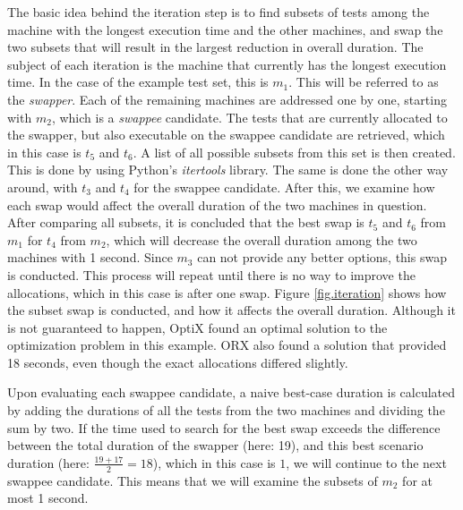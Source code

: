 The basic idea behind the iteration step is to find subsets of tests among the machine with the longest execution time and the other machines, and swap the two subsets that will result in the largest reduction in overall duration. The subject of each iteration is the machine that currently has the longest execution time. In the case of the example test set, this is $m_{1}$. This will be referred to as the \emph{swapper}. Each of the remaining machines are addressed one by one, starting with $m_{2}$, which is a \emph{swappee} candidate. The tests that are currently allocated to the swapper, but also executable on the swappee candidate are retrieved, which in this case is $t_{5}$ and $t_{6}$. A list of all possible subsets from this set is then created. This is done by using Python's \emph{itertools} library. The same is done the other way around, with $t_{3}$ and $t_{4}$ for the swappee candidate. After this, we examine how each swap would affect the overall duration of the two machines in question. After comparing all subsets, it is concluded that the best swap is $t_{5}$ and $t_{6}$ from $m_{1}$ for $t_{4}$ from $m_{2}$, which will decrease the overall duration among the two machines with 1 second. Since $m_{3}$ can not provide any better options, this swap is conducted. This process will repeat until there is no way to improve the allocations, which in this case is after one swap. Figure \ref{fig.iteration} shows how the subset swap is conducted, and how it affects the overall duration. Although it is not guaranteed to happen, OptiX found an optimal solution to the optimization problem in this example. ORX also found a solution that provided 18 seconds, even though the exact allocations differed slightly.

Upon evaluating each swappee candidate, a naive best-case duration is calculated by adding the durations of all the tests from the two machines and dividing the sum by two. If the time used to search for the best swap exceeds the difference between the total duration of the swapper (here: 19), and this best scenario duration (here: $\frac{19+17}{2} = 18$), which in this case is $1$, we will continue to the next swappee candidate. This means that we will examine the subsets of $m_{2}$ for at most 1 second.


